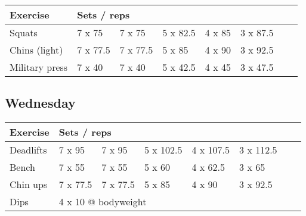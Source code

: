 \documentclass[12pt, a4paper]{article}%
\begin{document}
  \begin{tabular}{l|lllllll}
  \hspace{0.75em} \textbf{Exercise} & \multicolumn{ 7 }{l}{ \textbf{Sets / reps} } \\ \hline

            \hspace{0.75em} Squats
            & 7 x 75
            & 7 x 75
            & 5 x 82.5
            & 4 x 85
            & 3 x 87.5
            & 
            & 
            \\


            \hspace{0.75em} Chins (light)
            & 7 x 77.5
            & 7 x 77.5
            & 5 x 85
            & 4 x 90
            & 3 x 92.5
            & 
            & 
            \\


            \hspace{0.75em} Military press
            & 7 x 40
            & 7 x 40
            & 5 x 42.5
            & 4 x 45
            & 3 x 47.5
            & 
            & 
            \\


  \end{tabular}

  \subsection*{\hspace{0.5em} Wednesday }


  \begin{tabular}{l|lllllll}
  \hspace{0.75em} \textbf{Exercise} & \multicolumn{ 7 }{l}{ \textbf{Sets / reps} } \\ \hline

            \hspace{0.75em} Deadlifts
            & 7 x 95
            & 7 x 95
            & 5 x 102.5
            & 4 x 107.5
            & 3 x 112.5
            & 
            & 
            \\


            \hspace{0.75em} Bench
            & 7 x 55
            & 7 x 55
            & 5 x 60
            & 4 x 62.5
            & 3 x 65
            & 
            & 
            \\


            \hspace{0.75em} Chin ups
            & 7 x 77.5
            & 7 x 77.5
            & 5 x 85
            & 4 x 90
            & 3 x 92.5
            & 
            & 
            \\


   \hspace{0.75em} Dips &  \multicolumn{ 7 }{l}{ 4 x 10 @ bodyweight } \\
  \end{tabular}
\end{document}
